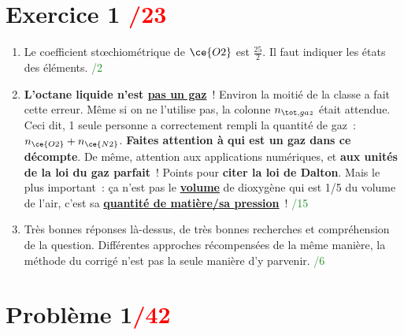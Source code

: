 \documentclass[a4paper, 10pt, final, garamond]{book}
\begin{document}
\section{Exercice 1 \hfill \textcolor{red}{/23}}

\begin{enumerate}
    \item Le coefficient stœchiométrique de $\ce{O2}$ est $\frac{25}{2}$. Il
        faut indiquer les états des éléments.
        \hfill \textcolor{ForestGreen}{/2}

    \item \textbf{L'octane liquide n'est \ul{pas un gaz}}~! Environ la moitié de
        la classe a fait cette erreur. Même si on ne l'utilise pas, la colonne
        $n_{\tot, gaz}$ était attendue. Ceci dit, 1 seule personne a
        correctement rempli la quantité de gaz~: $n_{\ce{O2}} + n_{\ce{N2}}$.
        \textbf{Faites attention à qui est un gaz dans ce décompte}. De même,
        attention aux applications numériques, et \textbf{aux unités de la loi
        du gaz parfait}~! Points pour \textbf{citer la loi de Dalton}. Mais le
        plus important~: ça n'est pas le \textbf{\ul{volume}} de dioxygène qui
        est 1/5 du volume de l'air, c'est sa \textbf{\ul{quantité de matière/sa
        pression}}~!
        \hfill \textcolor{ForestGreen}{/15}

    \item Très bonnes réponses là-dessus, de très bonnes recherches et
        compréhension de la question. Différentes approches récompensées de la
        même manière, la méthode du corrigé n'est pas la seule manière d'y parvenir.
        \hfill \textcolor{ForestGreen}{/6}
\end{enumerate}

\section{Problème 1\hfill \textcolor{red}{/42}}
\end{document}
